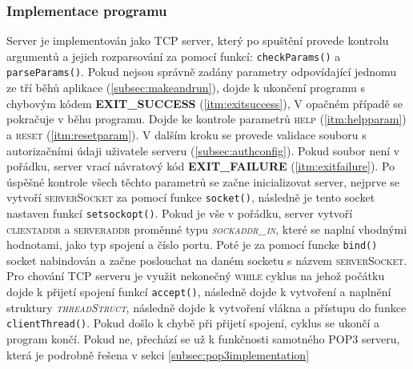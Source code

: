 \documentclass[11pt,a4paper]{report}
\begin{document}
    \subsubsection{Implementace programu}
    \label{subsec:serverimplementation}
    Server je implementován jako TCP server, který po spuštění provede kontrolu argumentů a jejich rozparsování za pomocí funkcí: \texttt{checkParams()} a \texttt{parseParams()}. Pokud nejsou správně zadány parametry odpovídající jednomu ze tří běhů aplikace (\ref{subsec:makeandrun}), dojde k ukončení programu s chybovým kódem \textbf{EXIT\_SUCCESS} (\ref{itm:exitsuccess}), V opačném případě se pokračuje v běhu programu. Dojde ke kontrole parametrů \textsc{help} (\ref{itm:helpparam}) a \textsc{reset} (\ref{itm:resetparam}). V dalším kroku se provede validace souboru s autorizačními údaji uživatele serveru (\ref{subsec:authconfig}). Pokud soubor není v pořádku, server vrací návratový kód \textbf{EXIT\_FAILURE} (\ref{itm:exitfailure}). Po úspěšné kontrole všech těchto parametrů se začne inicializovat server, nejprve se vytvoří \textsc{serverSocket} za pomocí funkce \texttt{socket()}, následně je tento socket nastaven funkcí \texttt{setsockopt()}. Pokud je vše v pořádku, server vytvoří \textsc{clientaddr} a \textsc{serveraddr} proměnné typu \textit{\textsc{sockaddr\_in}}, které se naplní vhodnými hodnotami, jako typ spojení a číslo portu. Poté je za pomocí funcke \texttt{bind()} socket nabindován a začne poslouchat na daném socketu s názvem \textsc{serverSocket}.
    Pro chování TCP serveru je využit nekonečný \textsc{while} cyklus na jehož počátku dojde k přijetí spojení funkcí \texttt{accept()}, následně dojde k vytvoření a naplnění struktury \textit{\textsc{threadStruct}}, následně dojde k vytvoření vlákna a přístupu do funkce \texttt{clientThread()}. Pokud došlo k chybě při přijetí spojení, cyklus se ukončí a program končí. Pokud ne, přechází se už k funkčnosti samotného POP3 serveru, která je podrobně řešena v sekci \ref{subsec:pop3implementation}
\end{document}
